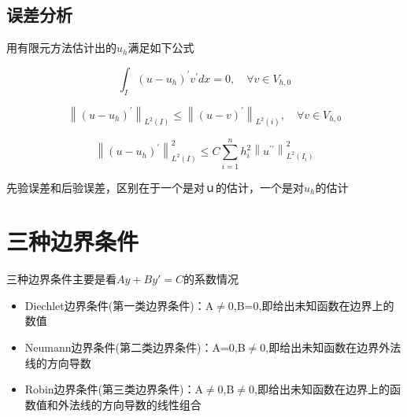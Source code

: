 \documentclass{article}
\begin{document}
\subsection{误差分析}
\begin{proposition}
用有限元方法估计出的$u_h$满足如下公式

\begin{equation}
\int_{I}\left(u-u_{h}\right)^{\prime} v^{\prime} d x=0, \quad \forall v \in V_{h, 0}
\end{equation}

\begin{equation}
\left\|\left(u-u_{h}\right)^{\prime}\right\|_{L^{2}(I)} \leq\left\|(u-v)^{\prime}\right\|_{L^{2}(i)}, \quad \forall v \in V_{h, 0}
\end{equation}

\begin{equation}
\left\|\left(u-u_{h}\right)^{\prime}\right\|_{L^{2}(I)}^{2} \leq C \sum_{i=1}^{n} h_{i}^{2}\left\|u^{\prime \prime}\right\|_{L^{2}\left(I_{i}\right)}^{2}
\end{equation}

\end{proposition}

先验误差和后验误差，区别在于一个是对ｕ的估计，一个是对$u_h$的估计

\section{三种边界条件}
三种边界条件主要是看$Ay+By'=C$的系数情况
\begin{itemize}
\item Diechlet边界条件(第一类边界条件)：A$\neq$0,B=0,即给出未知函数在边界上的数值

\item Neumann边界条件(第二类边界条件)：A=0,B$\neq$0,即给出未知函数在边界外法线的方向导数

\item Robin边界条件(第三类边界条件)：A$\neq$0,B$\neq$0,即给出未知函数在边界上的函数值和外法线的方向导数的线性组合
\end{itemize}

%
%
\end{document}
